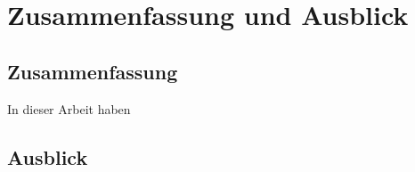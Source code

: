 
\chapter{Zusammenfassung und Ausblick} \label{Zusammenfassung}


\section{Zusammenfassung} \label{sec:sum}
	In dieser Arbeit haben 










\section{Ausblick} \label{sec:ausblick}



